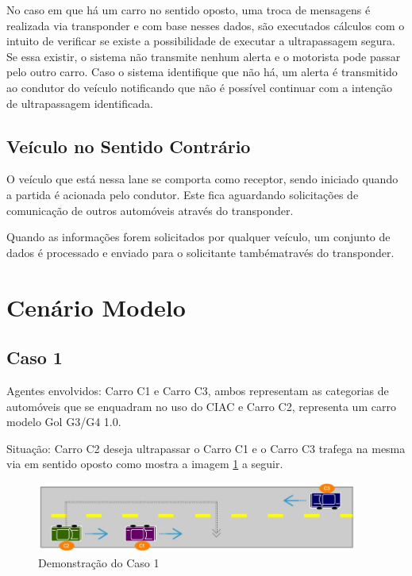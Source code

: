 No caso em que há um carro no sentido oposto, uma troca de mensagens é realizada
via transponder e com base nesses dados, são executados cálculos com o intuito
de verificar se existe a possibilidade de executar a ultrapassagem segura.
Se essa existir, o sistema não transmite nenhum alerta e o motorista pode passar
pelo outro carro. Caso o sistema identifique que não há, um alerta é transmitido
ao condutor do veículo notificando que não é possível continuar com a intenção
de ultrapassagem identificada.

\subsection{Veículo no Sentido Contrário}

O veículo que está nessa lane se comporta como receptor, sendo iniciado quando
a partida é acionada pelo condutor. Este fica aguardando solicitações de
comunicação de outros automóveis através do transponder.

Quando as informações forem
solicitados por qualquer veículo, um conjunto de dados é processado e enviado
para o solicitante tambématravés do transponder.

\section{Cenário Modelo}

\subsection{Caso 1}

Agentes envolvidos: Carro C1 e Carro C3, ambos representam as categorias de
automóveis que se enquadram no uso do CIAC e Carro C2, representa um carro
modelo Gol G3/G4 1.0.

Situação: Carro C2 deseja ultrapassar o Carro C1 e o Carro C3 trafega na mesma
via em sentido oposto como mostra a imagem \ref{fig:caso1} a seguir.

\begin{figure}[h]
  \centering
  \includegraphics[width=400px, scale=1]{figuras/caso1}
  \caption{Demonstração do Caso 1}
\label{fig:caso1}
\end{figure}

